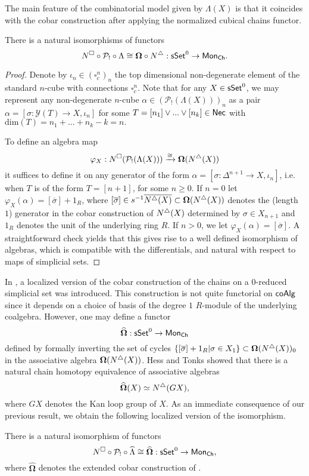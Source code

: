 The main feature of the combinatorial model given by $\Lambda(X)$ is that it coincides with the cobar construction after applying the normalized cubical chains functor. 

\begin{proposition}
There is a natural isomorphisms of functors 
$$N^{\square} \circ \mathcal{P}_! \circ \Lambda \cong \mathbf{\Omega} \circ N^{\triangle}: \mathsf{sSet}^0 \to \mathsf{Mon}_{\mathsf{Ch}}.$$
\end{proposition}

\begin{proof} 
Denote by $\iota_n \in (\square^n_c)_n$ the top dimensional non-degenerate element of the standard $n$-cube with connections $\square^n_c$. Note that for any $X \in \mathsf{sSet}^0$, we may represent any non-degenerate $n$-cube $\alpha \in (\mathcal{P}_!(\Lambda(X)))_n$ as a pair $\alpha=[\sigma: \mathcal{Y}(T) \to X, \iota_n]$ for some $T=[n_1] \vee ... \vee [n_k] \in \mathsf{Nec}$ with $\text{dim}(T)=n_1+ ...+n_k-k=n.$

To define an algebra map
$$\varphi_X: N^{\square}(\mathcal{P}_!(\Lambda(X))) \xrightarrow{\cong} \mathbf{\Omega}(N^{\triangle}(X))$$
it suffices to define it on any generator of the form $\alpha=[\sigma \colon \Delta^{n+1} \to X, \iota_{n}]$, i.e. when $T$ is of the form $T=[n+1]$, for some $n\geq0$. If $n=0$ let $\varphi_X(\alpha)= [\overline{\sigma}]+ 1_R$, where $[\overline{\sigma}] \in s^{-1} \overline{ N^{\triangle}(X)} \subset \mathbf{\Omega}(N^{\triangle}(X))$ denotes the (length $1$) generator in the cobar construction of $N^{\triangle}(X)$ determined by $\sigma \in X_{n+1}$ and $1_R$ denotes the unit of the underlying ring $R$. If $n>0$, we let $\varphi_X(\alpha)=[\overline{\sigma}]$. A straightforward check yields that this gives rise to a well defined isomorphism of algebras, which is compatible with the differentials, and natural with respect to maps of simplicial sets.  
\end{proof}
In \cite{Hess and Tonks}, a localized version of the cobar construction of the chains on a $0$-reduced simplicial set was introduced. This construction is not quite functorial on $\mathsf{coAlg}$ since it depends on a choice of basis of the degree $1$ $R$-module of the underlying coalgebra. However, one may define a functor $$\widehat{\mathbf{\Omega}}: \mathsf{sSet}^0 \to \mathsf{Mon}_{\mathsf{Ch}}$$
defined by formally inverting the set of cycles $\{ [\overline{\sigma}]+1_R | \sigma \in X_1 \} \subset \mathbf{\Omega}(N^{\triangle}(X))_0$ in the associative algebra $\mathbf{\Omega}(N^{\triangle}(X))$. Hess and Tonks showed that there is a natural chain homotopy equivalence of associative algebras $$\widehat{\mathbf{\Omega}}(X)\simeq N^{\triangle}(GX),$$ where $GX$ denotes the Kan loop group of $X$. As an immediate consequence of our previous result, we obtain the following localized version of the isomorphism.

\begin{corollary}
There is a natural isomorphism of functors
$$N^{\square} \circ \mathcal{P}_! \circ \widehat{\Lambda} \cong \widehat{\mathbf{\Omega}} :\mathsf{sSet}^0 \to \mathsf{Mon}_{\mathsf{Ch}},$$ where $\widehat{\mathbf{\Omega}}$ denotes the extended cobar construction of \cite{Hess and Tonks}. 
\end{corollary}


